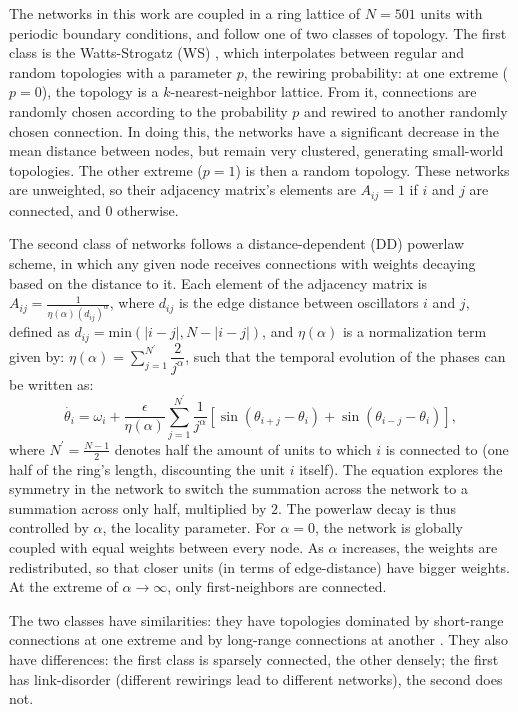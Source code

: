The networks in this work are coupled in a ring lattice of $N=501$ units with periodic boundary conditions, and follow one of two classes of topology. 
The first class is the Watts-Strogatz (WS) \cite{watts1998collective}, which interpolates between regular and random topologies with a parameter $p$, the rewiring probability: at one extreme ($p = 0$), the topology is a $k$-nearest-neighbor lattice. From it, connections are randomly chosen according to the probability $p$ and rewired to another randomly chosen connection. In doing this, the networks have a significant decrease in the mean distance between nodes, but remain very clustered, generating small-world topologies. The other extreme ($p = 1$) is then a random topology. These networks are unweighted, so their adjacency matrix's elements are $A_{ij} = 1$ if $i$ and $j$ are connected, and $0$ otherwise.

The second class of networks follows a distance-dependent (DD) powerlaw scheme, in which any given node receives connections with weights decaying based on the distance to it. Each element of the adjacency matrix is $A_{ij} =\frac{1}{\eta(\alpha) (d_{ij})^\alpha}$, where $d_{ij}$ is the edge distance between oscillators $i$ and $j$, defined as $d_{ij} = \mathrm{min}(|i - j|, N - |i - j|)$, and $\eta(\alpha)$ is a normalization term given by: $\eta(\alpha) = \sum\limits_{j=1}^{N^\prime}\dfrac{2}{j^{\alpha}}$, such that the temporal evolution of the phases can be written as:
% 
\begin{equation}
    \Dot{\theta_{i}} = \omega_{i} + \frac{\epsilon}{\eta(\alpha)} \sum\limits_{j=1}^{N^\prime} \frac{1}{j^\alpha} \left[ \sin{(\theta_{i+j} - \theta_{i})} + \sin{(\theta_{i-j} - \theta_{i})} \right],
    \label{eq:main_kuramoto_powerlaw}
\end{equation}
where $N^\prime = \frac{N-1}{2}$ denotes half the amount of units to which $i$ is connected to (one half of the ring's length, discounting the unit $i$ itself). The equation explores the symmetry in the network to switch the summation across the network to a summation across only half, multiplied by $2$.
The powerlaw decay is thus controlled by $\alpha$, the locality parameter. For $\alpha = 0$, the network is globally coupled with equal weights between every node. As $\alpha$ increases, the weights are redistributed, so that closer units (in terms of edge-distance) have bigger weights. At the extreme of $\alpha \to \infty$, only first-neighbors are connected.

The two classes have similarities: they have topologies dominated by short-range connections at one extreme and by long-range connections at another \cite{skardal2020higher, hong2013link}. They also have differences: the first class is sparsely connected, the other densely; the first has link-disorder (different rewirings lead to different networks), the second does not.  

